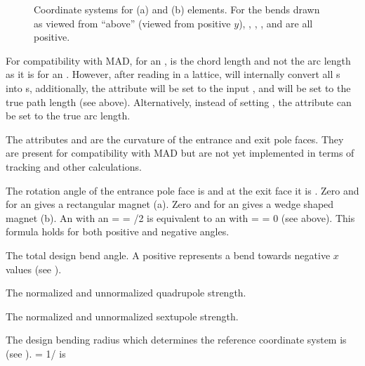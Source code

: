 \begin{figure}[tb]
  \caption[Coordinate systems for (a) \ and (b) \ elements.]
{Coordinate systems for (a)  and (b)  elements.
For the bends drawn as viewed from ``above'' (viewed from positive $y$),
, , ,  and  are all positive.}
  \label{f:bend}
\end{figure}

  \begin{description}
  \item[l, l_chord]  \Newline
For compatibility with MAD, for an ,  is the chord
length and not the arc length as it is for an .  However,
after reading in a lattice, \bmad will internally convert all
s into s, additionally, the  attribute
will be set to the input , and  will be set to the true
path length (see above). Alternatively, instead of setting , the
 attribute can be set to the true arc length.
  \item[h1, h2] \Newline
The attributes  and  are the curvature of the entrance
and exit pole faces. They are present for compatibility with MAD but
are not yet implemented in terms of tracking and other calculations.
  \item[e1, e2] \Newline
The rotation angle of the entrance pole face is  and at the
exit face it is . Zero  and  for an 
gives a rectangular magnet  (a). Zero  and 
for an  gives a wedge shaped magnet (b).
An  with an  =  = /2 is equivalent 
to an  with  =  = 0 (see above).
This formula holds for both positive and negative angles.
  \item[angle] \Newline
The total design bend angle. A positive  represents a
bend towards negative $x$ values (see ).
  \item[k1, b1_gradient] \Newline
The normalized and unnormalized quadrupole strength.
  \item[k2, b2_gradient] \Newline
The normalized and unnormalized sextupole strength. 
  \item[g, g_err, rho] \Newline
The design bending radius which determines the reference coordinate
system is  (see ).  = 1/ is

\end{description}
